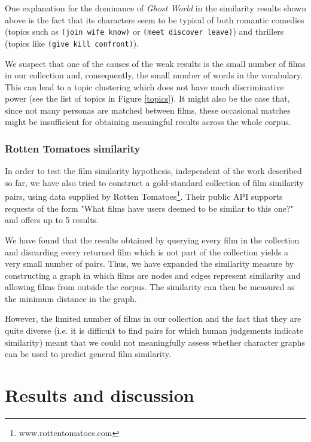 \documentclass[bsc,frontabs,singlespacing,parskip, twoside]{infthesis}
\begin{document}
One explanation for the dominance of \textit{Ghost World} in the similarity results shown above is the fact that its characters seem to be typical of both romantic comedies (topics such as \texttt{(join wife know)} or \texttt{(meet discover leave)}) and thrillers (topics like \texttt{(give kill confront)}).

We suspect that one of the causes of the weak results is the small number of films in our collection and, consequently, the small number of words in the vocabulary. This can lead to a topic clustering which does not have much discriminative power (see the list of topics in Figure \ref{topics}). It might also be the case that, since not many personas are matched between films, these occasional matches might be insufficient for obtaining meaningful results across the whole corpus.

\subsection{Rotten Tomatoes similarity}
In order to test the film similarity hypothesis, independent of the work described so far, we have also tried to construct a gold-standard collection of film similarity pairs, using data supplied by Rotten Tomatoes\footnote{www.rottentomatoes.com}. Their public API supports requests of the form "What films have users deemed to be similar to this one?" and offers up to 5 results.

We have found that the results obtained by querying every film in the collection and discarding every returned film which is not part of the collection yields a very small number of pairs. Thus, we have expanded the similarity measure by constructing a graph in which films are nodes and edges represent similarity and allowing films from outside the corpus. The similarity can then be measured as the minimum distance in the graph.

However, the limited number of films in our collection and the fact that they are quite diverse (i.e. it is difficult to find pairs for which human judgements indicate similarity) meant that we could not meaningfully assess whether character graphs can be used to predict general film similarity. 

\chapter{Results and discussion}
\label{chap:results}
\end{document}

